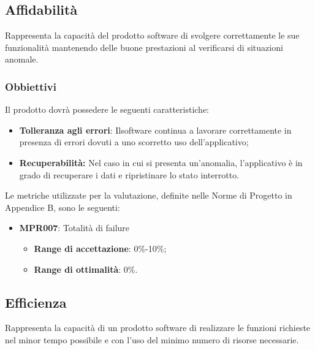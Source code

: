 \subsection{Affidabilità}
Rappresenta la capacità del prodotto software di svolgere correttamente le sue funzionalità mantenendo delle buone prestazioni al verificarsi di situazioni anomale.

\subsubsection{Obbiettivi} Il prodotto dovrà possedere le seguenti caratteristiche:
\begin{itemize}
	\item \textbf{Tolleranza agli errori}: Ilsoftware continua a lavorare correttamente in presenza di errori dovuti a uno scorretto uso dell'applicativo;
	\item \textbf{Recuperabilità:} Nel caso in cui si presenta un'anomalia, l'applicativo è in grado di recuperare i dati e ripristinare lo stato interrotto.
\end{itemize}

Le metriche utilizzate per la valutazione, definite nelle Norme di Progetto in Appendice B, sono le seguenti:
\begin{itemize}
	\item \textbf{MPR007}: Totalità di failure
	\begin{itemize}
		\item \textbf{Range di accettazione}: 0\%-10\%;
		\item \textbf{Range di ottimalità}: 0\%.
	\end{itemize}
\end{itemize}


\subsection{Efficienza}
Rappresenta la capacità di un prodotto software di realizzare le funzioni richieste nel minor tempo possibile e con l'uso del minimo numero di risorse necessarie. 
